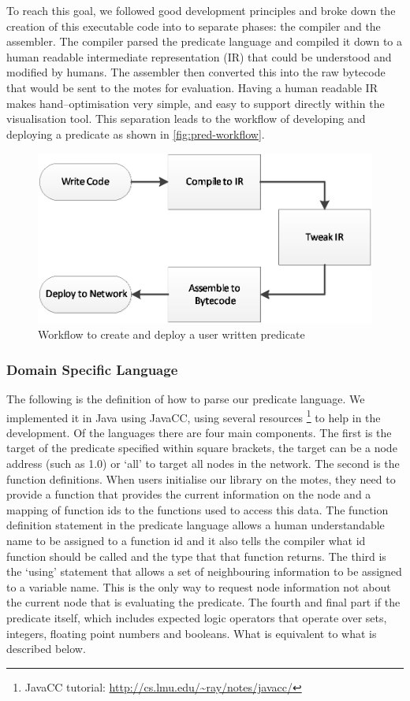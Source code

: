 To reach this goal, we followed good development principles and broke down the creation of this executable code into to separate phases: the compiler and the assembler. The compiler parsed the predicate language and compiled it down to a human readable intermediate representation (IR) that could be understood and modified by humans. The assembler then converted this into the raw bytecode that would be sent to the motes for evaluation. Having a human readable IR makes hand--optimisation very simple, and easy to support directly within the visualisation tool. This separation leads to the workflow of developing and deploying a predicate as shown in \autoref{fig:pred-workflow}.

\begin{figure}[H]
\centering
\includegraphics{Diagrams/predicate-dev-process.eps}
\caption{Workflow to create and deploy a user written predicate}
\label{fig:pred-workflow}
\end{figure}


\subsubsection{Domain Specific Language}

The following is the definition of how to parse our predicate language. We implemented it in Java using JavaCC, using several resources \footnote{JavaCC tutorial: \url{http://cs.lmu.edu/~ray/notes/javacc/}} to help in the development. Of the languages there are four main components. The first is the target of the predicate specified within square brackets, the target can be a node address (such as 1.0) or `all' to target all nodes in the network. The second is the function definitions. When users initialise our library on the motes, they need to provide a function that provides the current information on the node and a mapping of function ids to the functions used to access this data. The function definition statement in the predicate language allows a human understandable name to be assigned to a function id and it also tells the compiler what id function should be called and the type that that function returns. The third is the `using' statement that allows a set of neighbouring information to be assigned to a variable name. This is the only way to request node information not about the current node that is evaluating the predicate. The fourth and final part if the predicate itself, which includes expected logic operators that operate over sets, integers, floating point numbers and booleans. What is equivalent to what is described below.



